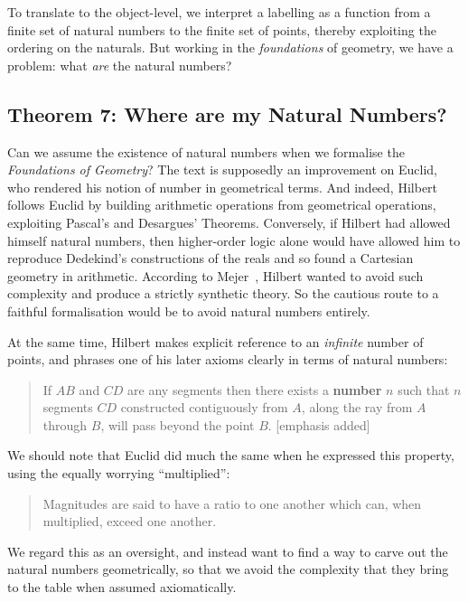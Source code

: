 \documentclass{article}
\begin{document}
To translate to the object-level, we interpret a labelling as a function from a finite set of natural numbers to the finite set of points, thereby exploiting the ordering on the naturals. But working in the \emph{foundations} of geometry, we have a problem: what \emph{are} the natural numbers?

\subsection{Theorem 7: Where are my Natural Numbers?}
Can we assume the existence of natural numbers when we formalise the \emph{Foundations of Geometry}? The text is supposedly an improvement on Euclid, who rendered his notion of number in geometrical terms. And indeed, Hilbert follows Euclid by building arithmetic operations from geometrical operations, exploiting Pascal's and Desargues' Theorems. Conversely, if Hilbert had allowed himself natural numbers, then higher-order logic alone would have allowed him to reproduce Dedekind's constructions of the reals and so found a Cartesian geometry in arithmetic. According to Mejer~\cite{MajerHilbertKleinComplexity}, Hilbert wanted to avoid such complexity and produce a strictly synthetic theory. So the cautious route to a faithful formalisation would be to avoid natural numbers entirely.

At the same time, Hilbert makes explicit reference to an \emph{infinite} number of points, and phrases one of his later axioms clearly in terms of natural numbers:

\begin{quote}
  If $AB$ and $CD$ are any segments then there exists a \textbf{number} $n$ such that $n$ segments $CD$ constructed contiguously from $A$, along the ray from $A$ through $B$, will pass beyond the point $B$.
[emphasis added]\end{quote}

We should note that Euclid did much the same when he expressed this property, using the equally worrying ``multiplied'':

\begin{quote}
  Magnitudes are said to have a ratio to one another which can, when multiplied, exceed one another.\cite{Aleph0Elements}
\end{quote}

We regard this as an oversight, and instead want to find a way to carve out the natural numbers geometrically, so that we avoid the complexity that they bring to the table when assumed axiomatically.
\end{document}
